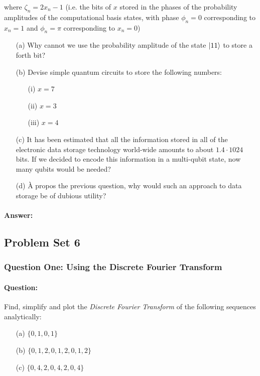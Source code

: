 \documentclass[reprint, amsmath,amssymb, aps]{revtex4-2}
\begin{document}
                where $\zeta_n = 2x_n - 1$ (i.e. the bits of $x$ stored in the phases of the probability amplitudes of the computational basis states, with phase $\phi_n=0$ corresponding to $x_n=1$ and $\phi_n=\pi$ corresponding to $x_n=0$)
                \begin{itemize}
                    \item[(a)] Why cannot we use the probability amplitude of the state $\ket{11}$ to store a forth bit?
                    \item[(b)] Devise simple quantum circuits to store the following numbers:
                        \begin{itemize}
                            \item[(i)] $x = 7$
                            \item[(ii)] $x = 3$
                            \item[(iii)] $x = 4$
                        \end{itemize}
                    \item[(c)] It has been estimated that all the information stored in all of the electronic data storage technology world-wide amounts to about $1.4 \cdot 1024$ bits. If we decided to encode this information in a multi-qubit state, now many qubits would be needed?
                    \item[(d)] {\`A} propos the previous question, why would such an approach to data storage be of dubious utility?
                \end{itemize}

                \begin{mdframed}
                \paragraph{Answer:}

                
                \end{mdframed}

        \subsection{Problem Set 6}
            \subsubsection{Question One: Using the Discrete Fourier Transform}
                \paragraph{Question:} Find, simplify and plot the \textit{Discrete Fourier Transform} of the following sequences analytically:
                \begin{itemize}
                    \item[(a)] $\{0,1,0,1\}$
                    \item[(b)] $\{0,1,2,0,1,2,0,1,2\}$
                    \item[(c)] $\{0,4,2,0,4,2,0,4\}$
                \end{itemize}
\end{document}
